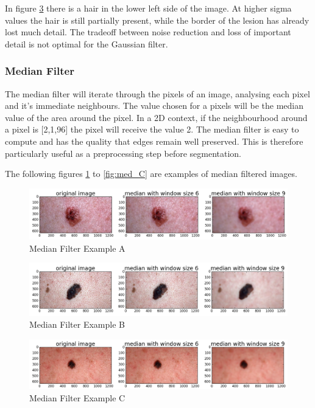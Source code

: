 In figure \ref{fig:med_B} there is a hair in the lower left side of the image. At higher sigma values the hair is still partially present, while the border of the lesion has already lost much detail. The tradeoff between noise reduction and loss of important detail is not optimal for the Gaussian filter.

\subsubsection{Median Filter}

The median filter will iterate through the pixels of an image, analysing each pixel and it's immediate neighbours. The value chosen for a pixels will be the median value of the area around the pixel. In a 2D context, if the neighbourhood around a pixel is [2,1,96] the pixel will receive the value 2. The median filter is easy to compute and has the quality that edges remain well preserved. This is therefore particularly useful as a preprocessing step before segmentation.

The following figures \ref{fig:med_A} to \ref{fig:med_C} are examples of median filtered images.

\begin{figure}[H]
    \includegraphics[width=\textwidth,keepaspectratio]{assets/image_processing/noise_reduction/figure_01.png}
    \caption{Median Filter Example A}
    \label{fig:med_A}
\end{figure}
\begin{figure}[H]
    \includegraphics[width=\textwidth,keepaspectratio]{assets/image_processing/noise_reduction/figure_02.png}
    \caption{Median Filter Example B}
    \label{fig:med_B}
\end{figure}
\begin{figure}[H]
    \includegraphics[width=\textwidth,keepaspectratio]{assets/image_processing/noise_reduction/figure_03.png}
    \caption{Median Filter Example C}
    \label{fig:med_B}
\end{figure}

